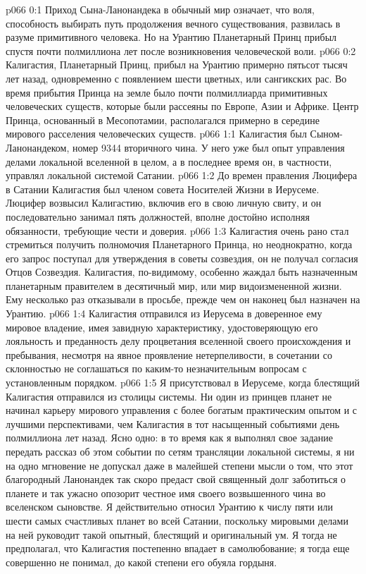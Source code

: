 \author{Мелхиседек}
\vs p066 0:1 Приход Сына\hyp{}Ланонандека в обычный мир означает, что воля, способность выбирать путь продолжения вечного существования, развилась в разуме примитивного человека. Но на Урантию Планетарный Принц прибыл спустя почти полмиллиона лет после возникновения человеческой воли.
\vs p066 0:2 Калигастия, Планетарный Принц, прибыл на Урантию примерно пятьсот тысяч лет назад, одновременно с появлением шести цветных, или сангикских рас. Во время прибытия Принца на земле было почти полмиллиарда примитивных человеческих существ, которые были рассеяны по Европе, Азии и Африке. Центр Принца, основанный в Месопотамии, располагался примерно в середине мирового расселения человеческих существ.
\vs p066 1:1 Калигастия был Сыном\hyp{}Ланонандеком, номер 9344 вторичного чина. У него уже был опыт управления делами локальной вселенной в целом, а в последнее время он, в частности, управлял локальной системой Сатании.
\vs p066 1:2 До времен правления Люцифера в Сатании Калигастия был членом совета Носителей Жизни в Иерусеме. Люцифер возвысил Калигастию, включив его в свою личную свиту, и он последовательно занимал пять должностей, вполне достойно исполняя обязанности, требующие чести и доверия.
\vs p066 1:3 \pc Калигастия очень рано стал стремиться получить полномочия Планетарного Принца, но неоднократно, когда его запрос поступал для утверждения в советы созвездия, он не получал согласия Отцов Созвездия. Калигастия, по\hyp{}видимому, особенно жаждал быть назначенным планетарным правителем в десятичный мир, или мир видоизмененной жизни. Ему несколько раз отказывали в просьбе, прежде чем он наконец был назначен на Урантию.
\vs p066 1:4 Калигастия отправился из Иерусема в доверенное ему мировое владение, имея завидную характеристику, удостоверяющую его лояльность и преданность делу процветания вселенной своего происхождения и пребывания, несмотря на явное проявление нетерпеливости, в сочетании со склонностью не соглашаться по каким\hyp{}то незначительным вопросам с установленным порядком.
\vs p066 1:5 Я присутствовал в Иерусеме, когда блестящий Калигастия отправился из столицы системы. Ни один из принцев планет не начинал карьеру мирового управления с более богатым практическим опытом и с лучшими перспективами, чем Калигастия в тот насыщенный событиями день полмиллиона лет назад. Ясно одно: в то время как я выполнял свое задание передать рассказ об этом событии по сетям трансляции локальной системы, я ни на одно мгновение не допускал даже в малейшей степени мысли о том, что этот благородный Ланонандек так скоро предаст свой священный долг заботиться о планете и так ужасно опозорит честное имя своего возвышенного чина во вселенском сыновстве. Я действительно относил Урантию к числу пяти или шести самых счастливых планет во всей Сатании, поскольку мировыми делами на ней руководит такой опытный, блестящий и оригинальный ум. Я тогда не предполагал, что Калигастия постепенно впадает в самолюбование; я тогда еще совершенно не понимал, до какой степени его обуяла гордыня.
